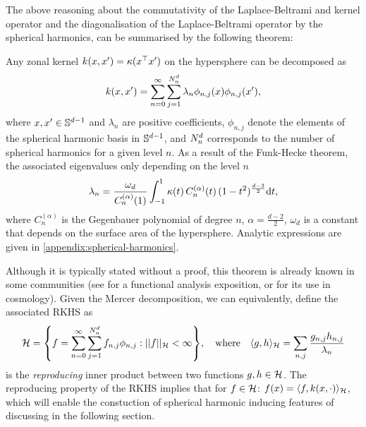 The above reasoning about the commutativity of the Laplace-Beltrami and kernel operator and the diagonalisation of the Laplace-Beltrami operator by the spherical harmonics, can be summarised by the following theorem:
\begin{theorem}
Any zonal kernel $k(x, x') = \kappa(x^{\top} x')$ on the hypersphere can be decomposed as
\begin{equation}
\label{eq:kernel-form}
    k(x, x') = \sum_{n=0}^{\infty} \sum_{j=1}^{N^d_n} \lambda_{n} \phi_{n,j}(x) \phi_{n,j}(x'),
\end{equation}
where $x,x' \in \mathbb{S}^{d-1}$ and $\lambda_{n}$ are positive coefficients, $\phi_{n,j}$ denote the elements of the spherical harmonic basis in $\mathbb{S}^{d-1}$, and $N^d_n$ corresponds to the number of spherical harmonics for a given level $n$. As a result of the Funk-Hecke theorem, the associated eigenvalues only depending on the level $n$
\begin{equation}
    \label{eq:compute-eigenvalues}
        \lambda_{n} = \frac{\omega_{d}}{C_n^{(\alpha)}(1)} \int_{-1}^1 \kappa(t)\,C_n^{(\alpha)}(t)\,(1 - t^2)^{\frac{d-3}{2}} \mathrm{d}{t},
\end{equation} 
where $C_n^{(\alpha)}$ is the Gegenbauer polynomial of degree $n$, $\alpha = \frac{d-2}{2}$, $\omega_d$ is a constant that depends on the surface area of the hypersphere. Analytic expressions are given in \cref{appendix:spherical-harmonics}.
\end{theorem}
Although it is typically stated without a proof, this theorem is already known in some communities (see \citet{wendland2005} for a functional analysis exposition, or \citet{peacock1999cosmological} for its use in cosmology). Given the Mercer decomposition, we can equivalently, define the associated RKHS as
\begin{equation}
    \label{eq:rkhs-sphere}
    \rkhs = \left\{
    f = 
    \sum_{n=0}^\infty \sum_{j=1}^{\dnumharmonicsforlevel} {f}_{n,j} \sh_{n, j}:
    \norm{f}_{\rkhs} < \infty
    \right\},
    \quad\text{where}\quad
    \langle g, h \rangle_{\rkhs} = 
    \sum_{n,j}
            \frac{{g}_{n, j} {h}_{n, j}}{\lambda_{n}}
\end{equation}
is the \emph{reproducing} inner product between two functions $g,h \in {\mathcal{H}}$. The reproducing property of the RKHS implies that for $f \in {\mathcal{H}}$: $f(x) = \langle f, k(x, \cdot) \rangle_{{\mathcal{H}}}$, which will enable the constuction of spherical harmonic inducing features of discussing in the following section.

